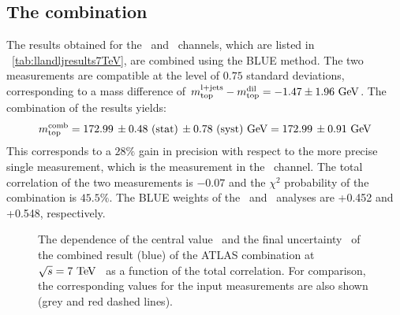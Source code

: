\subsection{The combination}
\label{sec:7TeVcombination}
%
The results obtained for the \ttbarll\ and \ttbarlj\ channels, which are listed in \tab~\ref{tab:llandljresults7TeV}, are combined using the \gls{BLUE} method. 
%
The two measurements are compatible at the level of $0.75$ standard deviations, corresponding to a mass difference of $m_{\mathrm{top}}^{\mathrm{l+jets}}-m_{\mathrm{top}}^{\mathrm{dil}} = -1.47 \pm 1.96~\mathrm{GeV}$. 
%
The combination of the results yields:
%
\[
m_{\mathrm{top}}^{\mathrm{comb}} = 172.99\,\pm 0.48~\mathrm{(stat)}\,\pm 0.78~\mathrm{(syst)}~\mathrm{GeV} = 172.99\,\pm 0.91~\mathrm{GeV}
\]
%
This corresponds to a $28\%$ gain in precision with respect to the more precise single measurement, which is the measurement in the \ttbarlj\ channel. 
%
The total correlation of the two measurements is $-0.07$ and the $\chi^2$ probability of the combination is $45.5\%$. 
%
The \gls{BLUE} weights of the \ttbarll\ and \ttbarlj\ analyses are +0.452 and +0.548, respectively.
%
%
\begin{figure}[tbp!]
\centering
{}
\hfill
\caption[Stability of the combination for $\sqrts=7$~\TeV\ data]{
%
The dependence of the central value~ and the final uncertainty~ of the combined result (blue) of the \gls{ATLAS} combination at ${\sqrt{s}}=7~\mathrm{TeV}$~\cite{Aad:2015nba} as a function of the total correlation. For comparison, the corresponding values for the input measurements are also shown (grey and red dashed lines).
  \label{fig:combinationrho}}
\end{figure}





